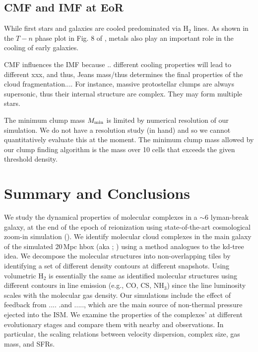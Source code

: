 \documentclass[iop]{emulateapj} %
\begin{document}
\subsection{CMF and IMF at EoR}

While first stars and galaxies are cooled predominated via H$_2$ lines.
As shown in the $T-n$ phase plot in Fig. 8 of \citealt{Pallottini17b}, metals also play an important role in the cooling of early galaxies.


CMF influences the IMF because .. different cooling properties will lead to different xxx, and thus, Jeans mass/thus determines the final properties of the cloud fragmentation....  For instance, massive protostellar clumps are always supersonic, thus their internal structure are complex. They may form multiple stars.


The minimum clump mass $M_{\rm min}$ is limited by numerical resolution of our simulation. We do not have a resolution study (in hand) and so we cannot quantitatively evaluate this at the moment. The minimum clump mass allowed
by our clump finding algorithm is the mass over 10 cells that exceeds the given threshold density.



\section{Summary and Conclusions}      \label{sec:conclusion}

We study the dynamical properties of molecular complexes in a \z$\sim$6 lyman-break galaxy,
at the end of the epoch of reionization using state-of-the-art cosmological zoom-in simulation
(). We identify molecular cloud complexes in the main galaxy of the
simulated 20\,Mpc h\pmOne box (aka \flower; \citealt{Pallottini17a}) using a method analogues
to the kd-tree idea. We decompose the molecular structures into non-overlapping tiles
by identifying a set of different density contours at different snapshots.
Using volumetric H$_2$ is essentially the same as identified molecular structures using
different contours in line emission (e.g., CO, CS, NH$_3$)
since the line luminosity scales with the molecular gas density.
Our simulations include the effect of feedback from .... .and ....., which are the main source
of non-thermal pressure ejected into the ISM.
We examine the properties of the complexes' at different evolutionary stages and compare
them with nearby and \highz observations. In particular,
the scaling relations between velocity dispersion, complex size, gas mass,
and SFRs.
\end{document}
